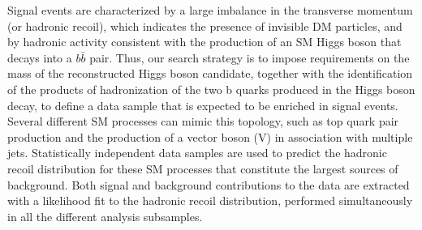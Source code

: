 Signal events are characterized by a large imbalance in the transverse
momentum (or hadronic recoil), which indicates the presence of invisible
DM particles, and by hadronic activity consistent with the production
of an SM Higgs boson that decays into a $b\bar{b}$ pair. Thus, our search
strategy is to impose requirements on the mass of the reconstructed
Higgs boson candidate, together with the identification of the
products of hadronization of the two b quarks produced in the Higgs
boson decay, to define a data sample that is expected to be enriched
in signal events. Several different SM processes can mimic this topology, such as top quark pair production and the production of a vector boson (V) in association with multiple jets. Statistically independent data samples are used to predict the hadronic recoil distribution for these SM processes that constitute the largest sources of background.
Both signal and background contributions to the data are extracted with a likelihood fit to the hadronic recoil distribution, performed simultaneously in all the different analysis subsamples.
